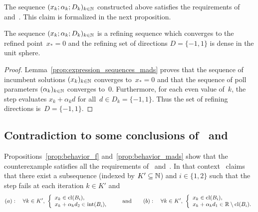The sequence $(x_k;\alpha_k;D_k)_{k\in\mathbb{N}}$ constructed above satisfies the requirements of~\cite[Theorem~4.1]{ViCu2012} and~\cite[Corollary~4.1]{ViCu2012}. This claim is formalized in the next proposition.

\vspace{0.1cm}

\begin{proposition}
	\label{prop:behavior_mads}
	The sequence $(x_k;\alpha_k;D_k)_{k \in \mathbb{N}}$ is a refining sequence which converges to the refined point~$x_* = 0$ and the refining set of directions $D = \{-1,1\}$ is dense in the unit sphere.
\end{proposition}

\begin{proof}
	Lemma~\ref{prop:expression_sequences_mads} proves that the sequence of incumbent solutions $(x_k)_{k \in \mathbb{N}}$ converges to~$x_* = 0$ and that the sequence of poll parameters $(\alpha_k)_{k \in \mathbb{N}}$ converges to~$0$. 
	Furthermore, for each even value of~$k$, the \poll step evaluates $x_k+\alpha_kd$ for all~$d \in D_k = \{-1,1\}$.
    Thus the set of refining directions is~$D = \{-1,1\}$.
\end{proof}



\subsection{Contradiction to some conclusions of~\cite[Theorem~4.1]{ViCu2012} and~\cite[Corollary~4.1]{ViCu2012}}
\label{sec:counterexample/theorems_contradicted}

Propositions~\ref{prop:behavior_f} and~\ref{prop:behavior_mads} show that the counterexample satisfies all the requirements of~\cite[Theorem~4.1]{ViCu2012} and~\cite[Corollary~4.1]{ViCu2012}.
In that context~\cite[Theorem~4.1]{ViCu2012} claims that there exist a subsequence (indexed by $K' \subseteq \mathbb{N}$) and $i \in \{1,2\}$ such that the \poll step fails at each iteration $k \in K'$ and
\begin{equation*}
	(a):\quad
	\forall k \in K',~
	\left\{\begin{array}{l}
		x_k             \in \mathrm{cl}(B_i), \\
		x_k+\alpha_kd_2 \in \mathrm{int}(B_i),
	\end{array}\right.
	\qquad \mbox{and} \qquad
	(b):\quad
	\forall k \in K',~
	\left\{\begin{array}{l}
		x_k             \in \mathrm{cl}(B_i), \\
		x_k+\alpha_kd_1 \in \mathbb{R} \setminus \mathrm{cl}(B_i).
	\end{array}\right.
\end{equation*}

